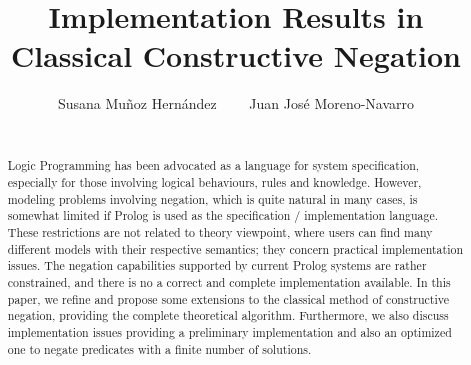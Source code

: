 \documentclass{llncs}
\begin{document}

\title{Implementation Results in \\
       Classical Constructive Negation}

\author{Susana Mu\~{n}oz Hern\'{a}ndez~~~~ Juan Jos\'{e} Moreno-Navarro \\
 ~~~~ }


\maketitle


%



\begin{abstract}
  Logic Programming has been advocated as a language for system
  specification, especially for those involving logical behaviours,
  rules and knowledge. However, modeling problems involving negation,
  which is quite natural in many cases, is somewhat limited if Prolog
  is used as the specification / implementation language. These
  restrictions are not related to theory viewpoint, where users can
  find many different models with their respective semantics; they
  concern practical implementation issues.  The negation capabilities
  supported by current Prolog systems are rather constrained, and
  there is no a correct and complete implementation available.  
  In this paper,
  we refine and propose some extensions to the classical method of
  constructive negation, providing the complete theoretical
  algorithm. Furthermore, we also discuss implementation issues
  providing a preliminary implementation and also an optimized
  one to negate predicates with a finite number of
  solutions.
\end{abstract}
\end{document}
